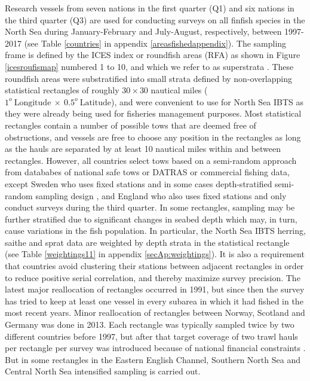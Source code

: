 \documentclass[a4paper 12pt]{article}
\numberwithin{equation}{section}
\begin{document}
\indent Research vessels from seven nations in the first quarter (Q1) and six nations in the third quarter (Q3) are used for conducting surveys on all finfish species in the North Sea during January-February and July-August, respectively, between 1997-2017 (see Table \ref{countries} in appendix \ref{areasfishedappendix}). The sampling frame is defined by the ICES index or roundfish areas (RFA) as shown in Figure \ref{icesroufismap} numbered 1 to 10, and which we refer to as superstrata \citep{nottestad2015quantifying, fuller2011sampling}. These  roundfish areas were substratified into small strata defined by non-overlapping statistical rectangles of roughly $30 \times 30$ nautical miles ($1^{o} \  \mathrm{Longitude} \ \times  \  0.5^{o} \ \mathrm{Latitude}$), and were convenient to use for North Sea IBTS as they were already being used for fisheries management purposes. Most statistical rectangles contain a number of possible tows that are deemed free of obstructions, and vessels are free to choose any position in the rectangles as long as the hauls are separated by at least 10 nautical miles within and between rectangles. However, all countries select tows based on a semi-random approach from datababes of national safe tows or DATRAS or commercial fishing data, except Sweden who uses fixed stations and in some cases depth-stratified semi-random sampling design \citep{ICES2018}, and England who also uses fixed stations and only conduct surveys during the third quarter. In some rectangles, sampling may be further stratified due to significant changes in seabed depth which may, in turn, cause variations in the fish population. In particular, the North Sea IBTS herring, saithe and sprat data are weighted by depth strata in the statistical rectangle (see Table \ref{weightings11} in appendix \ref{secAp:weightings}). It is also a requirement that countries avoid clustering their stations between adjacent rectangles in order to reduce positive serial correlation, and thereby maximize survey precision.  The latest major reallocation of rectangles occurred in 1991, but since then the survey has tried to keep at least one vessel in every subarea in which it had fished in the most recent years. Minor reallocation of rectangles between Norway, Scotland and Germany was done in 2013. Each rectangle was  typically sampled twice by two different countries before 1997, but after that target coverage of two trawl hauls per rectangle per survey  was introduced because of national financial constraints \citep{ICES2015}. But in some rectangles in the Eastern English Channel, Southern North Sea and Central North Sea intensified sampling is carried out.\\
\end{document}
